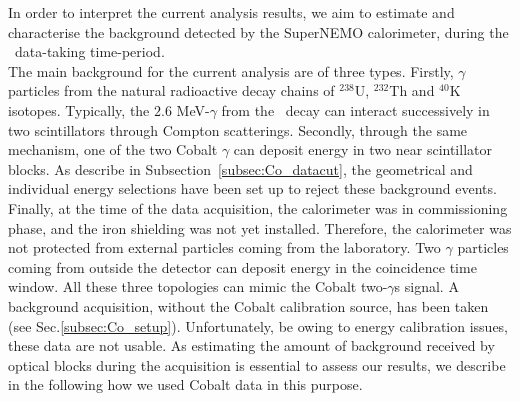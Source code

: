 In order to interpret the current analysis results, we aim to estimate and characterise the background detected by the SuperNEMO calorimeter, during the \Co\ data-taking time-period.\\

The main background for the current analysis are of three types.
Firstly, $\gamma$ particles from the natural radioactive decay chains of $^{238}$U, $^{232}$Th and $^{40}$K isotopes.
Typically, the $2.6$ MeV-$\gamma$ from the \Tl\ decay can interact successively in two scintillators through Compton scatterings.
Secondly, through the same mechanism, one of the two Cobalt $\gamma$ can deposit energy in two near scintillator blocks.
As describe in Subsection~\ref{subsec:Co_datacut}, the geometrical and individual energy selections have been set up to reject these background events.
Finally, at the time of the data acquisition, the calorimeter was in commissioning phase, and the iron shielding was not yet installed.
Therefore, the calorimeter was not protected from external particles coming from the laboratory.
Two $\gamma$ particles coming from outside the detector can deposit energy in the coincidence time window.
All these three topologies can mimic the Cobalt two-$\gamma$s signal.
A background acquisition, without the Cobalt calibration source, has been taken (see Sec.\ref{subsec:Co_setup}).
Unfortunately, be owing to energy calibration issues, these data are not usable.
As estimating the amount of background received by optical blocks during the acquisition is essential to assess our results, we describe in the following how we used Cobalt data in this purpose.

